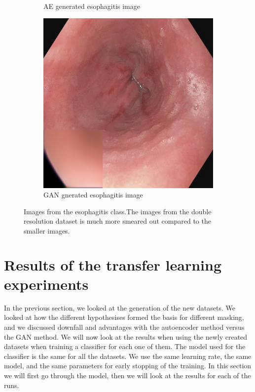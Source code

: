\begin{figure}[t]
\begin{subfigure}[t]{\myfigsizethree}
            \caption{AE generated esophagitis image}    
            \label{fig:AE_512}
        \end{subfigure}
        \qquad
        \begin{subfigure}[t]{\myfigsizethree}  
            \centering 
            \includegraphics[width=\textwidth]{experiments/figures/512/cc.jpg}
            \caption{GAN gnerated esophagitis image}    
            \label{fig:GAN_512}
        \end{subfigure}
        \caption{Images from the esophagitis class.The images from the double resolution dataset is much more smeared out compared to the smaller images.} 
        \label{fig:AE_GAN_512}
    \end{figure}



   
\FloatBarrier
\section{Results of the transfer learning experiments}In the previous section, we looked at the generation of the new datasets. We looked at how the different hypothesises formed the basis for different masking, and we discussed downfall and advantages with the autoencoder method versus the GAN method. 
We will now look at the results when using the newly created datasets when training a classifier for each one of them. 
The model used for the classifier is the same for all the datasets. We use the same learning rate, the same model, and the same parameters for early stopping of the training.  In this section we will first go through the model, then we will look at the results for each of the runs.



